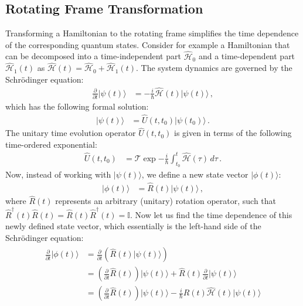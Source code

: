 \documentclass[../Thesis-IJspeert.tex]{subfiles}
\begin{document}
\begin{appendices}
\chapter{Rotating Frame Transformation}
\label{rotatingframeapp}
Transforming a Hamiltonian to the rotating frame simplifies the time dependence of the corresponding quantum states. Consider for example a Hamiltonian that can be decomposed into a time-independent part $\hat{\mathcal{H}}_0$ and a time-dependent part $\hat{\mathcal{H}}_1(t)$ as $\hat{\mathcal{H}}(t) = \hat{\mathcal{H}}_0 + \hat{\mathcal{H}}_1(t)$. The system dynamics are governed by the Schrödinger equation:
\begin{align}
\frac{\partial}{\partial t} \lvert \psi(t) \rangle &= -\frac{i}{\hbar} \hat{\mathcal{H}}(t) \lvert \psi(t) \rangle\,,
\end{align}
which has the following formal solution:
\begin{align}
\lvert \psi(t) \rangle &= \hat{U}(t, t_0) \lvert \psi(t_0) \rangle\,.
\end{align}
The unitary time evolution operator $\hat{U}(t, t_0)$ is given in terms of the following time-ordered exponential:
\begin{align}
\hat{U}(t, t_0) &= \mathcal{T} \exp { -\frac{i}{\hbar} \int_{t_0}^{t} \hat{\mathcal{H}}(\tau) \, d\tau }\,.
\end{align}
Now, instead of working with $\lvert \psi(t) \rangle$, we define a new state vector $\lvert \phi(t) \rangle$:
\begin{align}
\lvert \phi(t) \rangle &= \hat{R}(t) \lvert \psi(t) \rangle\,,
\end{align}
where $\hat{R}(t)$ represents an arbitrary (unitary) rotation operator, such that $\hat{R}^{\dagger}(t) \hat{R}(t) = \hat{R}(t) \hat{R}^{\dagger}(t) = \mathbb{I}$. Now let us find the time dependence of this newly defined state vector, which essentially is the left-hand side of the Schrödinger equation:
\begin{align}
\begin{split}
\frac{\partial}{\partial t} \lvert \phi(t) \rangle &= \frac{\partial}{\partial t} \left( \hat{R}(t) \lvert \psi(t) \rangle \right) \\
&= \left( \frac{\partial}{\partial t} \hat{R}(t) \right) \lvert \psi(t) \rangle + \hat{R}(t) \frac{\partial}{\partial t} \lvert \psi(t) \rangle \\
&= \left( \frac{\partial}{\partial t} \hat{R}(t) \right) \lvert \psi(t) \rangle - \frac{i}{\hbar} \hat{R}(t) \hat{\mathcal{H}}(t) \lvert \psi(t) \rangle \\

\end{split}
\end{align}
\end{appendices}
\end{document}
